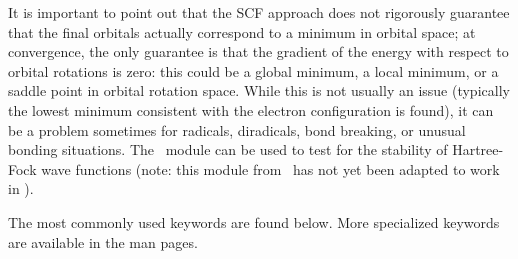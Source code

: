 It is important to point out that the
SCF approach does not rigorously guarantee that the final orbitals
actually correspond to a minimum in orbital space; at convergence,
the only guarantee is that the gradient of the energy with respect 
to orbital rotations is zero: this could be a global minimum, a local
minimum, or a saddle point in orbital rotation space.  While this
is not usually an issue (typically the lowest minimum consistent with 
the electron configuration is found), it can be a problem sometimes for 
radicals, diradicals, bond breaking, or unusual bonding situations.  The
\PSIstable\ module can be used to test for the stability of Hartree-Fock
wave functions (note: this module from \PSIthree\ has not yet been adapted
to work in \PSIfour).

The most commonly used keywords are found below.  More specialized keywords
are available in the man pages.

